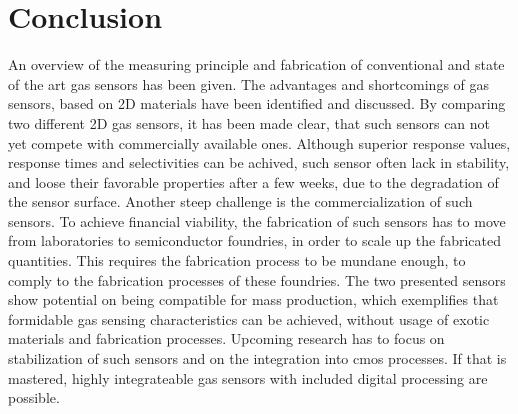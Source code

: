\section{Conclusion}
\label{sec:conclusion}

An overview of the measuring principle and fabrication of conventional and state of the art gas sensors has been given. The advantages and shortcomings of gas sensors, based on 2D materials have been identified and discussed. By comparing two different 2D gas sensors, it has been made clear, that such sensors can not yet compete with commercially available ones. Although superior response values, response times and selectivities can be achived, such sensor often lack in stability, and loose their favorable properties after a few weeks, due to the degradation of the sensor surface. Another steep challenge is the commercialization of such sensors. To achieve financial viability, the fabrication of such sensors has to move from laboratories to semiconductor foundries, in order to scale up the fabricated quantities. This requires the fabrication process to be mundane enough, to comply to the fabrication processes of these foundries. The two presented sensors show potential on being compatible for mass production, which exemplifies that formidable gas sensing characteristics can be achieved, without usage of exotic materials and fabrication processes. Upcoming research has to focus on stabilization of such sensors and on the integration into \gls{cmos} processes. If that is mastered, highly integrateable gas sensors with included digital processing are possible.
